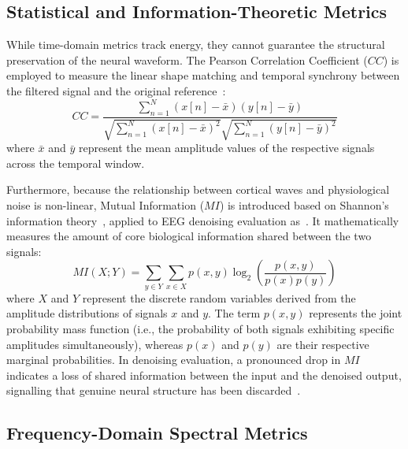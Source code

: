 \documentclass[MScCS,12pt,oneside,final]{uccthesis}
\begin{document}
        \subsection{Statistical and Information-Theoretic Metrics}
        \label{subsec:statistical_metrics}
        
        While time-domain metrics track energy, they cannot guarantee the structural preservation of the neural waveform. The Pearson Correlation Coefficient ($CC$) is employed to measure the linear shape matching and temporal synchrony between the filtered signal and the original reference~\parencite{chen2014eeg}:
        \begin{equation}
            CC = \frac{\sum_{n=1}^{N} (x[n] - \bar{x})(y[n] - \bar{y})}{\sqrt{\sum_{n=1}^{N} (x[n] - \bar{x})^2} \sqrt{\sum_{n=1}^{N} (y[n] - \bar{y})^2}}
        \label{eq:cc}
        \end{equation}
        where $\bar{x}$ and $\bar{y}$ represent the mean amplitude values of the respective signals across the temporal window.
        
        Furthermore, because the relationship between cortical waves and physiological noise is non-linear, Mutual Information ($MI$) is introduced based on Shannon's information theory~\parencite{cover1999elements}, applied to EEG denoising evaluation as~\parencite{longo2025oneegwavelad}. It mathematically measures the amount of core biological information shared between the two signals:
        \begin{equation}
            MI(X; Y) = \sum_{y \in Y} \sum_{x \in X} p(x,y) \log_{2} \left( \frac{p(x,y)}{p(x)p(y)} \right)
        \label{eq:mi}
        \end{equation}
        where $X$ and $Y$ represent the discrete random variables derived from the amplitude distributions of signals $x$ and $y$. The term $p(x,y)$ represents the joint probability mass function (i.e., the probability of both signals exhibiting specific amplitudes simultaneously), whereas $p(x)$ and $p(y)$ are their respective marginal probabilities. In denoising evaluation, a pronounced drop in $MI$ indicates a loss of shared information between the input and the denoised output, signalling that genuine neural structure has been discarded~\parencite{longo2025oneegwavelad}.

        \subsection{Frequency-Domain Spectral Metrics}
        \label{subsec:frequency_domain_metrics}
\end{document}

